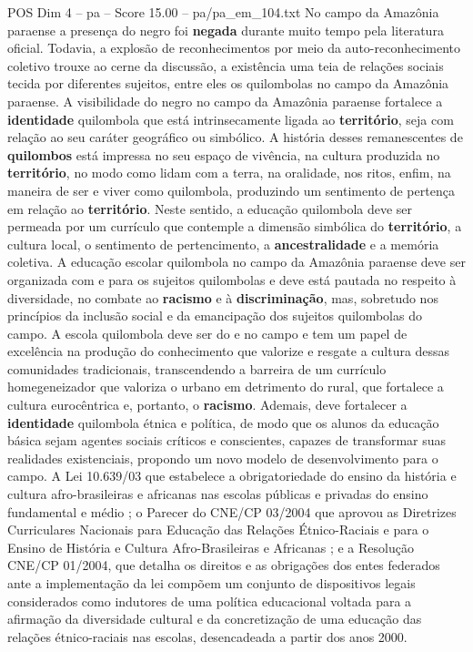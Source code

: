 \begin{textsample}{POS Dim 4 – pa – Score 15.00 – pa/pa\_em\_104.txt}
No campo da Amazônia paraense a presença do negro foi \textbf{negada} durante muito tempo pela literatura oficial.
Todavia, a explosão de reconhecimentos por meio da auto-reconhecimento coletivo trouxe ao cerne da discussão, a existência uma teia de relações sociais tecida por diferentes sujeitos, entre eles os quilombolas no campo da Amazônia paraense.
A visibilidade do negro no campo da Amazônia paraense fortalece a \textbf{identidade} quilombola que está intrinsecamente ligada ao \textbf{território}, seja com relação ao seu caráter geográfico ou simbólico.
A história desses remanescentes de \textbf{quilombos} está impressa no seu espaço de vivência, na cultura produzida no \textbf{território}, no modo como lidam com a terra, na oralidade, nos ritos, enfim, na maneira de ser e viver como quilombola, produzindo um sentimento de pertença em relação ao \textbf{território}.
Neste sentido, a educação quilombola deve ser permeada por um currículo que contemple a dimensão simbólica do \textbf{território}, a cultura local, o sentimento de pertencimento, a \textbf{ancestralidade} e a memória coletiva.
A educação escolar quilombola no campo da Amazônia paraense deve ser organizada com e para os sujeitos quilombolas e deve está pautada no respeito à diversidade, no combate ao \textbf{racismo} e à \textbf{discriminação}, mas, sobretudo nos princípios da inclusão social e da emancipação dos sujeitos quilombolas do campo.
A escola quilombola deve ser do e no campo e tem um papel de excelência na produção do conhecimento que valorize e resgate a cultura dessas comunidades tradicionais, transcendendo a barreira de um currículo homegeneizador que valoriza o urbano em detrimento do rural, que fortalece a cultura eurocêntrica e, portanto, o \textbf{racismo}.
Ademais, deve fortalecer a \textbf{identidade} quilombola étnica e política, de modo que os alunos da educação básica sejam agentes sociais críticos e conscientes, capazes de transformar suas realidades existenciais, propondo um novo modelo de desenvolvimento para o campo.
A Lei 10.639/03 que estabelece a obrigatoriedade do ensino da história e cultura afro-brasileiras e africanas nas escolas públicas e privadas do ensino fundamental e médio ; o Parecer do CNE/CP 03/2004 que aprovou as Diretrizes Curriculares Nacionais para Educação das Relações Étnico-Raciais e para o Ensino de História e Cultura Afro-Brasileiras e Africanas ; e a Resolução CNE/CP 01/2004, que detalha os direitos e as obrigações dos entes federados ante a implementação da lei compõem um conjunto de dispositivos legais considerados como indutores de uma política educacional voltada para a afirmação da diversidade cultural e da concretização de uma educação das relações étnico-raciais nas escolas, desencadeada a partir dos anos 2000.

\end{textsample}
